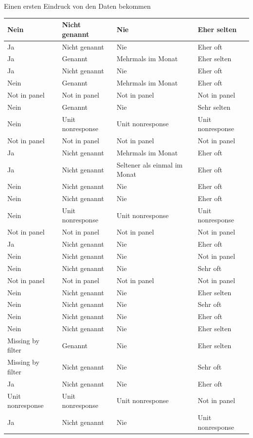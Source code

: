 \documentclass[ignorenonframetext,]{beamer}
\begin{document}
\begin{frame}{Einen ersten Eindruck von den Daten bekommen}
\begin{tabular}{l|l|l|l}
\hline
Nein & Nicht genannt & Nie & Eher selten\\
\hline
Ja & Nicht genannt & Nie & Eher oft\\
\hline
Ja & Genannt & Mehrmals im Monat & Eher selten\\
\hline
Ja & Nicht genannt & Nie & Eher oft\\
\hline
Nein & Genannt & Mehrmals im Monat & Eher oft\\
\hline
Not in panel & Not in panel & Not in panel & Not in panel\\
\hline
Nein & Genannt & Nie & Sehr selten\\
\hline
Nein & Unit nonresponse & Unit nonresponse & Unit nonresponse\\
\hline
Not in panel & Not in panel & Not in panel & Not in panel\\
\hline
Ja & Nicht genannt & Mehrmals im Monat & Eher oft\\
\hline
Ja & Nicht genannt & Seltener als einmal im Monat & Eher oft\\
\hline
Nein & Nicht genannt & Nie & Eher oft\\
\hline
Nein & Nicht genannt & Nie & Eher oft\\
\hline
Nein & Unit nonresponse & Unit nonresponse & Unit nonresponse\\
\hline
Not in panel & Not in panel & Not in panel & Not in panel\\
\hline
Ja & Nicht genannt & Nie & Eher oft\\
\hline
Nein & Nicht genannt & Nie & Not in panel\\
\hline
Nein & Nicht genannt & Nie & Sehr oft\\
\hline
Not in panel & Not in panel & Not in panel & Not in panel\\
\hline
Nein & Nicht genannt & Nie & Eher selten\\
\hline
Nein & Nicht genannt & Nie & Sehr oft\\
\hline
Nein & Nicht genannt & Nie & Eher oft\\
\hline
Nein & Nicht genannt & Nie & Eher selten\\
\hline
Missing by filter & Genannt & Nie & Eher selten\\
\hline
Missing by filter & Nicht genannt & Nie & Sehr oft\\
\hline
Ja & Nicht genannt & Nie & Eher oft\\
\hline
Unit nonresponse & Unit nonresponse & Unit nonresponse & Not in panel\\
\hline
Ja & Nicht genannt & Nie & Unit nonresponse\\

\end{tabular}
\end{frame}
\end{document}
